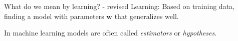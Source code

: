 \documentclass[dvipsnames]{beamer}
\begin{document}
		\begin{frame}{What do we mean by learning? - revised} \pause
		Learning: Based on training data, finding a model with parameters $\boldsymbol{w}$ that generalizes well.  \pause
		
		In machine learning models are often called \emph{estimators} or \emph{hypotheses}.
    \end{frame}
		
\end{document}
